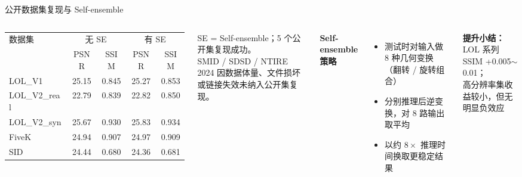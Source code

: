 \documentclass{beamer}
\begin{document}
\begin{frame}{公开数据集复现与 Self-ensemble}
  \begin{columns}[T]
    \scriptsize
    \renewcommand{\arraystretch}{1.15}
    \begin{tabular}{lcccc}
      \toprule
      \multirow{2}{*}{数据集} & \multicolumn{2}{c}{无 SE} & \multicolumn{2}{c}{有 SE} \\
      \cmidrule(lr){2-3}\cmidrule(lr){4-5}
      & PSNR & SSIM & PSNR & SSIM \\
      \midrule
      LOL\_V1      & 25.15 & 0.845 & 25.27 & 0.853 \\
      LOL\_V2\_real & 22.79 & 0.839 & 22.82 & 0.850 \\
      LOL\_V2\_syn  & 25.67 & 0.930 & 25.83 & 0.934 \\
      FiveK        & 24.94 & 0.907 & 24.97 & 0.909 \\
      SID          & 24.44 & 0.680 & 24.36 & 0.681 \\
      \bottomrule
    \end{tabular}
    \tiny SE = Self-ensemble；5 个公开集复现成功。\\
    SMID / SDSD / NTIRE 2024 因数据体量、文件损坏或链接失效未纳入公开集复现。

    \small
    \textbf{Self-ensemble 策略}
    \begin{itemize}
      \item 测试时对输入做 8 种几何变换（翻转 / 旋转组合）
      \item 分别推理后逆变换，对 8 路输出取平均
      \item 以约 $8\times$ 推理时间换取更稳定结果
    \end{itemize}
    \vspace{0.3em}
    \scriptsize
    \textbf{提升小结：}LOL 系列 SSIM +0.005$\sim$0.01；\\
    高分辨率集收益较小，但无明显负效应
  \end{columns}
\end{frame}
\end{document}

